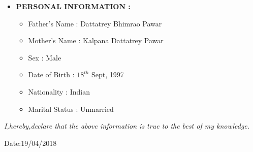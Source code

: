 \documentclass[11pt]{article}
\begin{document}
\begin{itemize}[label=$\star$]
		\bigskip
		\item	\begin{large} \textbf{PERSONAL INFORMATION :} \end{large}
		\begin{itemize}[label=$-$]
			\item	Father's Name  :  Dattatrey Bhimrao Pawar
			\item	Mother's Name  :  Kalpana Dattatrey Pawar
			\item	Sex            :  Male
			\item	Date of Birth  :  $18^{th}$ Sept, 1997
			\item   Nationality    :  Indian
			\item   Marital Status :  Unmarried
		\end{itemize}
	\end{itemize}
	\bigskip
	\begin{large}\textit{I,hereby,declare that the above information is true to the best of my knowledge.} \end{large}
	\begin{flushright} Date:19/04/2018 \end{flushright}
\end{document}
